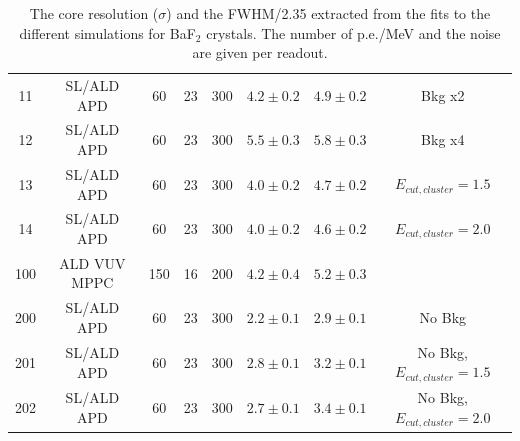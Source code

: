 \begin{table}[htb]
\begin{center}
\begin{tabular}{|c|c|c|c|c|c|c|c|}
11         & SL/ALD APD   & 60            & 23              & 300     & $ 4.2 \pm 0.2 $  & $ 4.9 \pm 0.2 $ & Bkg x2\\
12         & SL/ALD APD   & 60            & 23              & 300     & $ 5.5 \pm 0.3 $  & $ 5.8 \pm 0.3 $ & Bkg x4\\ 
13         & SL/ALD APD   & 60            & 23              & 300     & $ 4.0 \pm 0.2 $  & $ 4.7 \pm 0.2 $ & $E_{cut,cluster} = 1.5$  \\
14         & SL/ALD APD   & 60            & 23              & 300     & $ 4.0 \pm 0.2 $  & $ 4.6 \pm 0.2 $ & $E_{cut,cluster} = 2.0$  \\
100        & ALD VUV MPPC & 150           & 16              & 200     & $ 4.2 \pm 0.4 $  & $ 5.2 \pm 0.3 $ & \\\hline
200        & SL/ALD APD   & 60            & 23              & 300     & $ 2.2 \pm 0.1 $  & $ 2.9 \pm 0.1 $ & No Bkg \\ 
201        & SL/ALD APD   & 60            & 23              & 300     & $ 2.8 \pm 0.1 $  & $ 3.2 \pm 0.1 $ & No Bkg, $E_{cut,cluster} = 1.5$\\
202        & SL/ALD APD   & 60            & 23              & 300     & $ 2.7 \pm 0.1 $  & $ 3.4 \pm 0.1 $ & No Bkg, $E_{cut,cluster} = 2.0$\\ \hline
\end{tabular}
\end{center}
\caption{The core resolution ($\sigma$) and the FWHM/2.35 extracted from the fits to the different simulations for BaF$_2$ 
crystals. The number of p.e./MeV and the noise are given per readout.}
\label{sim:results1}
\end{table}   

